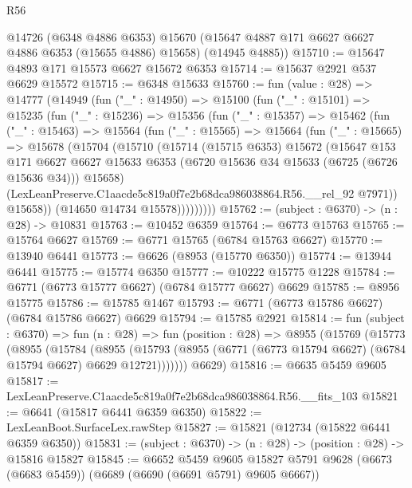\begin{lexlean}{R56}
\begin{coremodule}
      @14726
      (@6348 @4886 @6353)
      @15670
      (@15647 @4887 @171 @6627 @6627 @4886 @6353 (@15655 @4886) @15658)
      (@14945 @4885))
@15710 := @15647 @4893 @171 @15573 @6627 @15672 @6353
@15714 := @15637 @2921 @537 @6629 @15572
@15715 := @6348 @15633
@15760 := fun (value : @28) =>
  @14777
    (@14949
      (fun ("_" : @14950) =>
      @15100
        (fun ("_" : @15101) =>
        @15235
          (fun ("_" : @15236) =>
          @15356
            (fun ("_" : @15357) =>
            @15462
              (fun ("_" : @15463) =>
              @15564
                (fun ("_" : @15565) =>
                @15664
                  (fun ("_" : @15665) =>
                  @15678
                    (@15704
                      (@15710
                        (@15714
                          (@15715 @6353)
                          @15672
                          (@15647
                            @153
                            @171
                            @6627
                            @6627
                            @15633
                            @6353
                            (@6720 @15636 @34 @15633 (@6725 (@6726 @15636 @34)))
                            @15658)
                          (LexLeanPreserve.C1aacde5c819a0f7e2b68dca986038864.R56.__rel_92 @7971))
                        @15658))
                    (@14650 @14734 @15578)))))))))
@15762 := (subject : @6370) -> (n : @28) -> @10831
@15763 := @10452 @6359
@15764 := @6773 @15763
@15765 := @15764 @6627
@15769 := @6771 @15765 (@6784 @15763 @6627)
@15770 := @13940 @6441
@15773 := @6626 (@8953 (@15770 @6350))
@15774 := @13944 @6441
@15775 := @15774 @6350
@15777 := @10222 @15775 @1228
@15784 := @6771 (@6773 @15777 @6627) (@6784 @15777 @6627) @6629
@15785 := @8956 @15775
@15786 := @15785 @1467
@15793 := @6771 (@6773 @15786 @6627) (@6784 @15786 @6627) @6629
@15794 := @15785 @2921
@15814 := fun (subject : @6370) =>
  fun (n : @28) =>
  fun (position : @28) =>
  @8955
    (@15769
      (@15773
        (@8955
          (@15784
            (@8955
              (@15793 (@8955 (@6771 (@6773 @15794 @6627) (@6784 @15794 @6627) @6629 @12721)))))))
      @6629)
@15816 := @6635 @5459 @9605
@15817 := LexLeanPreserve.C1aacde5c819a0f7e2b68dca986038864.R56.__fits_103
@15821 := @6641 (@15817 @6441 @6359 @6350)
@15822 := LexLeanBoot.SurfaceLex.rawStep
@15827 := @15821 (@12734 (@15822 @6441 @6359 @6350))
@15831 := (subject : @6370) -> (n : @28) -> (position : @28) -> @15816 @15827
@15845 := @6652
    @5459
    @9605
    @15827
    @5791
    @9628
    (@6673 (@6683 @5459))
    (@6689 (@6690 (@6691 @5791) @9605 @6667))

\end{coremodule}
\end{lexlean}
